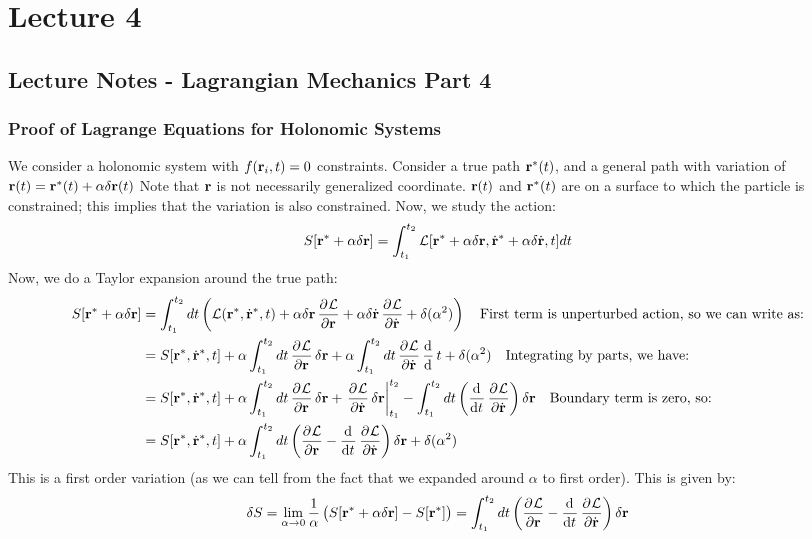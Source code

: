 \documentclass[../PHYS306Notes.tex]{subfiles}
\begin{document}
\section{Lecture 4}
\subsection{Lecture Notes - Lagrangian Mechanics Part 4}
\subsubsection{Proof of Lagrange Equations for Holonomic Systems}
We consider a holonomic system with $f(\mathbf{r}_i, t) = 0$ constraints. Consider a true path $\mathbf{r}^*(t)$, and a general path with variation of $\mathbf{r}(t) = \mathbf{r}^*(t) + \alpha\delta\mathbf{r}(t)$ Note that $\mathbf{r}$ is not necessarily generalized coordinate. $\mathbf{r}(t)$ and $\mathbf{r}^*(t)$ are on a surface to which the particle is constrained; this implies that the variation is also constrained. Now, we study the action:
\[S[\mathbf{r}^* + \alpha\delta\mathbf{r}] = \int_{t_1}^{t_2} \mathcal{L}[\mathbf{r}^* + \alpha\delta\mathbf{r}, \dot{\mathbf{r}}^* + \alpha\delta\dot{\mathbf{r}}, t]dt\]
Now, we do a Taylor expansion around the true path:
\begin{align*}
    S[\v{r}^* + \alpha\delta\v{r}] &= \int_{t_1}^{t_2} dt\left(\LL(\v{r}^*, \dot{\v{r}}^*, t) + \alpha\delta\v{r}\dpd{\LL}{\v{r}} + \alpha\delta\dot{\v{r}}\dpd{\LL}{\dot{\v{r}}} + \delta(\alpha^2) \right) \quad \text{First term is unperturbed action, so we can write as:}
    \\ &= S[\v{r}^*, \dot{\v{r}}^*, t] + \alpha\int_{t_1}^{t_2}dt\dpd{\LL}{\v{r}}\delta\v{r} + \alpha\int_{t_1}^{t_2}dt\dpd{\LL}{\dot{\v{r}}}\dod{}{}t + \delta(\alpha^2)\quad\text{Integrating by parts, we have:}
    \\&= S[\v{r}^*, \dot{\v{r}}^*, t] + \alpha\int_{t_1}^{t_2}dt\dpd{\LL}{\v{r}}\delta\v{r} + \left. \dpd{\LL}{\dot{\v{r}}}\delta\v{r}\right|_{t_1}^{t_2} - \int_{t_1}^{t_2}dt\left(\dod{}{t}\dpd{\LL}{\dot{\v{r}}}\right)\delta\v{r}\quad\text{Boundary term is zero, so:}
    \\&= S[\v{r}^*, \dot{\v{r}}^*, t] + \alpha\int_{t_1}^{t_2}dt\left(\dpd{\LL}{\v{r}} - \dod{}{t}\dpd{\LL}{\dot{\v{r}}}\right)\delta\v{r} + \delta(\alpha^2)
\end{align*}
This is a first order variation (as we can tell from the fact that we expanded around $\alpha$ to first order). This is given by:
\[\delta S = \lim_{\alpha \rightarrow 0}\frac{1}{\alpha}\left(S[\v{r}^* + \alpha\delta\v{r}] -S[\v{r}^*]\right) = \int_{t_1}^{t_2}dt\left(\dpd{\LL}{\v{r}} - \dod{}{t}\dpd{\LL}{\dot{\v{r}}}\right)\delta\v{r}\]
\end{document}
